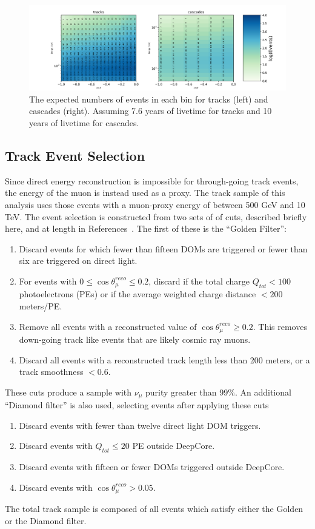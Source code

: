 \documentclass[main.tex]{subfiles}
\begin{document}
\begin{figure}
    \centering
    \includegraphics[width=0.8\linewidth]{figures/realization_joint.png}
    \caption{The expected numbers of events in each bin for tracks (left) and cascades (right). Assuming 7.6 years of livetime for tracks and 10 years of livetime for cascades.}\label{fig:event_no}
\end{figure}


\subsection{Track Event Selection}

Since direct energy reconstruction is impossible for through-going track events, the energy of the muon is instead used as a proxy.
The track sample of this analysis uses those events with a muon-proxy energy of between 500 GeV and 10 TeV. 
The event selection is constructed from two sets of of cuts, described briefly here, and at length in References~\cite{Aartsen_2020, Aartsen_2020_prd, axani2020sterile}. %
The first of these is the ``Golden Filter'':

\begin{enumerate}
    \item Discard events for which fewer than fifteen DOMs are triggered or fewer than six are triggered on direct light.
    \item  For events with $0\leq\cos\theta_{\mu}^{reco}\leq 0.2$, discard if the total charge $Q_{tot}<100$ photoelectrons (PEs) or if the average weighted charge distance $<200$ meters/PE. 
    \item Remove all events with a reconstructed value of $\cos\theta_{\mu}^{reco}\geq 0.2$. This removes down-going track like events that are likely cosmic ray muons. 
    \item Discard all events with a reconstructed track length less than 200 meters, or a track smoothness $<0.6$.
\end{enumerate}

These cuts produce a sample with $\nu_{\mu}$ purity greater than 99\%. %
An additional ``Diamond filter'' is also used, selecting events after applying these cuts
\begin{enumerate}
    \item Discard events with fewer than twelve direct light DOM triggers. 
    \item Discard events with $Q_{tot}\leq20$ PE outside DeepCore. 
    \item Discard events with fifteen or fewer DOMs triggered outside DeepCore. 
    \item Discard events with $\cos\theta_{\mu}^{reco}>0.05$.
\end{enumerate}
The total track sample is composed of all events which satisfy either the Golden or the Diamond filter. 
\end{document}
